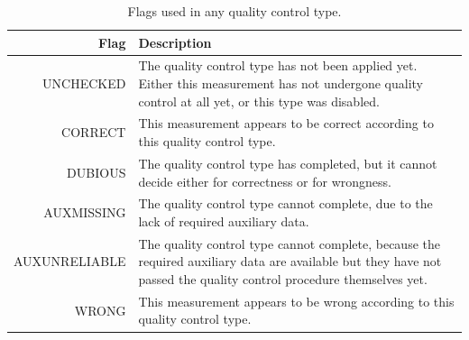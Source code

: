 \documentclass[authoryear,preprint,review,12pt]{elsarticle}
\begin{document}
\begin{table}[]
    \begin{scriptsize}
    \centering
    \begin{tabular}{r p{10cm}}
    \hline
    Flag & Description \\
    \hline
	UNCHECKED & The quality control type has not been applied yet. Either this measurement has not undergone quality control at all yet, or this type was disabled.\\
	CORRECT & This measurement appears to be correct according to this quality control type. \\
	DUBIOUS & The quality control type has completed, but it cannot decide either for correctness or for wrongness. \\
	AUXMISSING & The quality control type cannot complete, due to the lack of required auxiliary data. \\
	AUXUNRELIABLE & The quality control type cannot complete, because the required auxiliary data are available but they have not passed the quality control procedure themselves yet. \\
	WRONG & This measurement appears to be wrong according to this quality control type. \\
    \hline
    \end{tabular}
    \caption{Flags used in any quality control type.}
    \label{tab:flagsSummary}
    \end{scriptsize}
\end{table}
\end{document}
